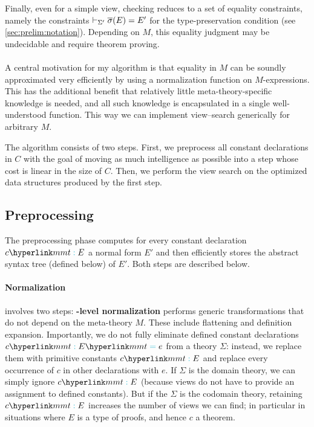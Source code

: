 Finally, even for a simple view, checking reduces to a set of equality constraints, namely the constraints $\vdash_{\Sigma'}\overline{\sigma}(E)=E'$ for the type-preservation condition (see \autoref{sec:prelim:notation}).
Depending on $M$, this equality judgment may be undecidable and require theorem proving.

\paragraph{}%
A central motivation for my algorithm is that equality in $M$ can be soundly approximated very efficiently by using a normalization function on $M$-expressions.
This has the additional benefit that relatively little meta-theory-specific knowledge is needed, and all such knowledge is encapsulated in a single well-understood function.
This way we can implement view--search generically for arbitrary $M$.

The algorithm consists of two steps.
First, we preprocess all constant declarations in $C$ with the goal of moving as much intelligence as possible into a step whose cost is linear in the size of $C$.
Then, we perform the view search on the optimized data structures produced by the first step.

\subsection{Preprocessing}

The preprocessing phase computes for every constant declaration $c\mmttp E$ a normal form $E'$ and then efficiently stores the abstract syntax tree (defined below) of $E'$.
Both steps are described below.

\paragraph{Normalization}\label{sec:normalizeintra}
involves two steps: \textbf{\mmt-level normalization} performs generic transformations that do not depend on the meta-theory $M$.
These include flattening and definition expansion.
Importantly, we do not fully eliminate defined constant declarations $c\mmttp E\mmtdf e$ from a theory $\Sigma$: instead, we replace them with primitive constants $c\mmttp E$ and replace every occurrence of $c$ in other declarations with $e$.
If $\Sigma$ is the domain theory, we can simply ignore $c\mmttp E$ (because views do not have to provide an assignment to defined constants).
But if the $\Sigma$ is the codomain theory, retaining $c\mmttp E$ increases the number of views we can find; in particular in situations where $E$ is a type of proofs, and hence $c$ a theorem.

